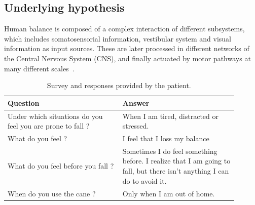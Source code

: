 \documentclass[conference]{IEEEtran}
\begin{document}
\subsection{Underlying hypothesis}
\label{sec:hypothesis}

Human balance is composed of a complex interaction of different subsystems, which includes somatosensorial information, vestibular system and visual information as input sources.  These are later processed in different networks of the Central Nervous System (CNS), and finally actuated by motor pathways at many different scales~\cite{Donato.etal2016}.

\begin{table}[t]
\begin{center}
\begin{tabular}[!t]{|p{0.45\linewidth} |p{0.45\linewidth} |}
\hline
\textbf{Question} & \textbf{Answer} \\
\hline
\hline
Under which situations do you feel you are prone to fall ? & When I am tired, distracted or stressed. \\
\hline
What do you feel ?  & I feel that I loss my balance\\
\hline
What do you feel before you fall ? & Sometimes I do feel something before.  I realize that I am going to fall, but there isn't anything I can do to avoid it. \\
\hline
When do you use the cane ?  & Only when I am out of home.\\
\hline
\end{tabular}
\vspace{2pt}
\caption{Survey and responses provided by the patient.}
\label{tab:patientsurvey}
\end{center}
\end{table}
\end{document}
